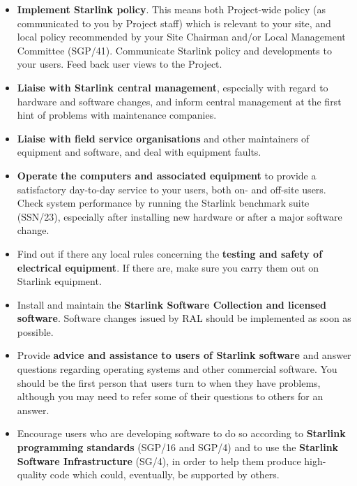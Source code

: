 \documentclass[twoside,11pt]{article}
\newcommand{\xref}[3]{#1}
\begin{document}
\begin{itemize}

\item {\bf Implement Starlink policy}.
This means both Project-wide policy (as communicated to you by Project staff)
which is relevant to your site, and local policy recommended by your Site
Chairman and/or Local Management Committee
(\xref{SGP/41}{sgp41}{}).
Communicate Starlink policy and developments to your users.
Feed back user views to the Project.

\item {\bf Liaise with Starlink central management}, especially with regard to
hardware and software changes, and inform central management at the first hint
of problems with maintenance companies.

\item {\bf Liaise with field service organisations} and other
maintainers of equipment and software, and deal with equipment faults.

\item {\bf Operate the computers and associated equipment} to provide a
satisfactory day-to-day service to your users, both on- and off-site users.
Check system performance by running the Starlink benchmark suite
(\xref{SSN/23}{ssn23}{}),
especially after installing new hardware or after a major software change.

\item Find out if there any local rules concerning the {\bf testing and safety
of electrical equipment}.
If there are, make sure you carry them out on Starlink equipment.

\item Install and maintain the {\bf Starlink Software Collection and licensed
software}.
Software changes issued by RAL should be implemented as soon as possible.

\item Provide {\bf advice and assistance to users of Starlink software} and
answer questions regarding operating systems and other commercial software.
You should be the first person that users turn to when they have problems,
although you may need to refer some of their questions to others for an
answer.

\item Encourage users who are developing software to do so according to
{\bf Starlink programming standards}
(\xref{SGP/16}{sgp16}{} and
\xref{SGP/4}{sgp4}{}) and to use the {\bf Starlink Software Infrastructure}
(\xref{SG/4}{sg4}{}), in order to help them produce
high-quality code which could, eventually, be supported by others.


\end{itemize}
\end{document}
